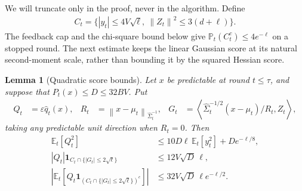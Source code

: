 \documentclass[11pt]{article}
\newtheorem{lemma}[lemma]{Lemma}
\newcommand{\E}{\mathbb E}
\newcommand{\Pp}{\mathbb P}
\newcommand{\1}{\mathbf 1}
\newcommand{\eps}{\varepsilon}
\newcommand{\ip}[2]{\left\langle #1,#2\right\rangle}
\newcommand{\norm}[1]{\left\lVert #1\right\rVert}
\newcommand{\normm}[2]{\left\lVert #1\right\rVert_{#2}}
\begin{document}
We will truncate only in the proof, never in the algorithm. Define
\begin{align}
    C_t=\{|y_t|\leq4V\sqrt\ell,\ \norm{Z_t}^2\leq3(d+\ell)\}.
    \label{eq:common-truncation}
\end{align}
The feedback cap and the chi-square bound below give
$\Pp_t(C_t^c)\leq4e^{-\ell}$ on a stopped round.
The next estimate keeps the linear Gaussian score at its natural
second-moment scale, rather than bounding it by the squared Hessian score.
\begin{lemma}[Quadratic score bounds]
    \label{lem:quadratic-score-bounds}
    Let $x$ be predictable at round $t\leq\tau$, and suppose that
    $P_t(x)\leq D\leq32BV$. Put
    \begin{align}
        Q_t & =\eps\widehat q_t(x),
            & R_t                   & =\normm{x-\mu_t}{\widehat\Sigma_t^{-1}},
            & G_t                   & =\ip{\widehat\Sigma_t^{-1/2}(x-\mu_t)/R_t}{Z_t},
    \end{align}
    taking any predictable unit direction when $R_t=0$. Then
    \begin{align}
        \E_t[Q_t^2]
         & \leq10D\ell\,\E_t[y_t^2]+De^{-\ell/8},
        \label{eq:q-predictable-second-moment}
        \\
        |Q_t|\1_{C_t\cap\{|G_t|\leq2\sqrt\ell\}}
         & \leq12V\sqrt D\,\ell,
        \label{eq:q-score-bound}
        \\
        \left|\E_t\left[Q_t\1_{(C_t\cap\{|G_t|\leq2\sqrt\ell\})^c}\right]\right|
         & \leq32V\sqrt D\,\ell e^{-\ell/2}.
        \label{eq:q-truncation-bias}
    \end{align}
\end{lemma}
\end{document}
